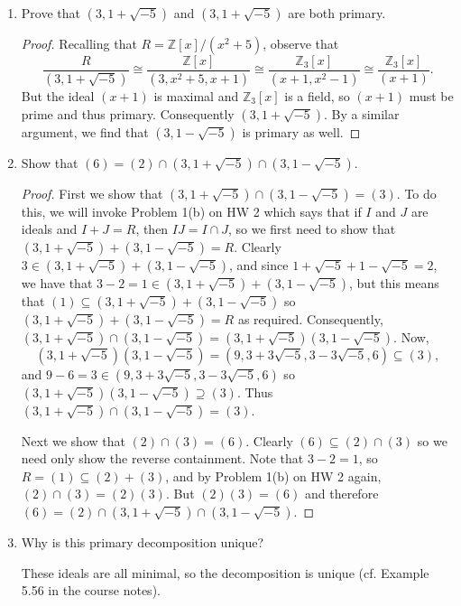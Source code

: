 \documentclass[11pt,oneside,english]{amsart}
\theoremstyle{definition}
\newcommand{\MB}[1]{\mathbb{#1}}
\begin{document}
\begin{enumerate}[leftmargin=*]
\begin{enumerate}
\pagebreak

\item Prove that $(3, 1+\sqrt{-5})$ and $(3, 1+\sqrt{-5})$ are both primary.

\begin{proof}
Recalling that $R=\MB{Z}[x]/(x^2+5)$, observe that
\[
\frac{R}{(3,1+\sqrt{-5})}\cong \frac{\MB{Z}[x]}{(3,x^2+5,x+1)}\cong \frac{\MB{Z}_3[x]}{(x+1,x^2-1)}\cong\frac{\MB{Z}_3[x]}{(x+1)}.
\]
But the ideal $(x+1)$ is maximal and $\MB{Z}_3[x]$ is a field, so $(x+1)$ must be prime and thus primary. Consequently $(3,1+\sqrt{-5})$. By a similar argument, we find that $(3,1-\sqrt{-5})$ is primary as well.
\end{proof}

\item Show that $(6) = (2) \cap (3, 1+\sqrt{-5}) \cap (3, 1 -\sqrt{-5})$.

\begin{proof}
First we show that $(3,1+\sqrt{-5})\cap(3,1-\sqrt{-5})=(3)$. To do this, we will invoke Problem 1(b) on HW 2 which says that if $I$ and $J$ are ideals and $I+J=R$, then $IJ=I\cap J$, so we first need to show that $ (3, 1+\sqrt{-5}) + (3, 1 -\sqrt{-5}) =R$. Clearly $3\in (3, 1+\sqrt{-5}) + (3, 1 -\sqrt{-5})$, and since $1+\sqrt{-5}+ 1 -\sqrt{-5}=2$, we have that $3-2=1\in (3, 1+\sqrt{-5}) + (3, 1 -\sqrt{-5})$, but this means that $(1)\subseteq (3, 1+\sqrt{-5}) + (3, 1 -\sqrt{-5})$ so $(3, 1+\sqrt{-5}) + (3, 1 -\sqrt{-5}) =R$ as required. Consequently, $(3, 1+\sqrt{-5}) \cap (3, 1 -\sqrt{-5})  =(3, 1+\sqrt{-5})(3, 1 -\sqrt{-5})$. Now,
\[
(3, 1+\sqrt{-5})(3, 1 -\sqrt{-5})=(9,3+3\sqrt{-5},3-3\sqrt{-5},6)\subseteq(3),
\]
and $9-6=3\in (9,3+3\sqrt{-5},3-3\sqrt{-5},6)$ so $(3, 1+\sqrt{-5})(3, 1 -\sqrt{-5})\supseteq (3)$. Thus $(3, 1+\sqrt{-5})\cap(3, 1 -\sqrt{-5})=(3)$.

Next we show that $(2)\cap(3)=(6)$. Clearly $(6)\subseteq (2)\cap (3)$ so we need only show the reverse containment. Note that $3-2=1$, so $R=(1)\subseteq(2)+(3)$, and by Problem 1(b) on HW 2 again, $(2)\cap(3)=(2)(3)$. But $(2)(3)=(6)$ and therefore $(6) = (2) \cap (3, 1+\sqrt{-5}) \cap (3, 1 -\sqrt{-5})$.
\end{proof}

\item Why is this primary decomposition unique?

These ideals are all minimal, so the decomposition is unique (cf. Example 5.56 in the course notes).
\end{enumerate}


\end{enumerate}
\end{document}
